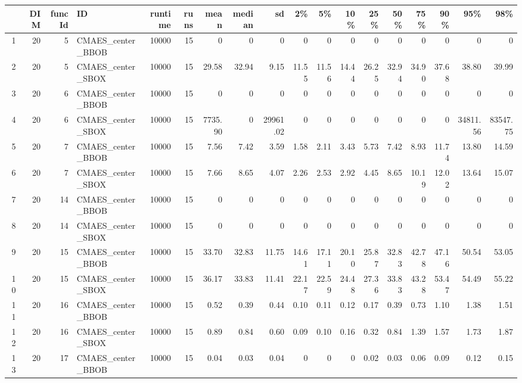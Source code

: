 \begin{table*}[!t]
\centering
\tiny
\begin{tabular}{rrrlrrrrrrrrrrrrrr}
  \hline
 & DIM & funcId & ID & runtime & runs & mean & median & sd & 2\% & 5\% & 10\% & 25\% & 50\% & 75\% & 90\% & 95\% & 98\% \\ 
  \hline
1 & 20 & 5 & CMAES\_center\_BBOB & 10000 &  15 & 0 & 0 & 0 & 0 & 0 & 0 & 0 & 0 & 0 & 0 & 0 & 0 \\ 
  2 & 20 & 5 & CMAES\_center\_SBOX & 10000 &  15 & 29.58 & 32.94 & 9.15 & 11.55 & 11.56 & 14.44 & 26.25 & 32.94 & 34.90 & 37.68 & 38.80 & 39.99 \\ 
  3 & 20 & 6 & CMAES\_center\_BBOB & 10000 &  15 & 0 & 0 & 0 & 0 & 0 & 0 & 0 & 0 & 0 & 0 & 0 & 0 \\ 
  4 & 20 & 6 & CMAES\_center\_SBOX & 10000 &  15 & 7735.90 & 0 & 29961.02 & 0 & 0 & 0 & 0 & 0 & 0 & 0 & 34811.56 & 83547.75 \\ 
  5 & 20 & 7 & CMAES\_center\_BBOB & 10000 &  15 & 7.56 & 7.42 & 3.59 & 1.58 & 2.11 & 3.43 & 5.73 & 7.42 & 8.93 & 11.74 & 13.80 & 14.59 \\ 
  6 & 20 & 7 & CMAES\_center\_SBOX & 10000 &  15 & 7.66 & 8.65 & 4.07 & 2.26 & 2.53 & 2.92 & 4.45 & 8.65 & 10.19 & 12.02 & 13.64 & 15.07 \\ 
  7 & 20 & 14 & CMAES\_center\_BBOB & 10000 &  15 & 0 & 0 & 0 & 0 & 0 & 0 & 0 & 0 & 0 & 0 & 0 & 0 \\ 
  8 & 20 & 14 & CMAES\_center\_SBOX & 10000 &  15 & 0 & 0 & 0 & 0 & 0 & 0 & 0 & 0 & 0 & 0 & 0 & 0 \\ 
  9 & 20 & 15 & CMAES\_center\_BBOB & 10000 &  15 & 33.70 & 32.83 & 11.75 & 14.61 & 17.11 & 20.10 & 25.87 & 32.83 & 42.78 & 47.16 & 50.54 & 53.05 \\ 
  10 & 20 & 15 & CMAES\_center\_SBOX & 10000 &  15 & 36.17 & 33.83 & 11.41 & 22.17 & 22.59 & 24.48 & 27.36 & 33.83 & 43.28 & 53.47 & 54.49 & 55.22 \\ 
  11 & 20 & 16 & CMAES\_center\_BBOB & 10000 &  15 & 0.52 & 0.39 & 0.44 & 0.10 & 0.11 & 0.12 & 0.17 & 0.39 & 0.73 & 1.10 & 1.38 & 1.51 \\ 
  12 & 20 & 16 & CMAES\_center\_SBOX & 10000 &  15 & 0.89 & 0.84 & 0.60 & 0.09 & 0.10 & 0.16 & 0.32 & 0.84 & 1.39 & 1.57 & 1.73 & 1.87 \\ 
  13 & 20 & 17 & CMAES\_center\_BBOB & 10000 &  15 & 0.04 & 0.03 & 0.04 & 0 & 0 & 0 & 0.02 & 0.03 & 0.06 & 0.09 & 0.12 & 0.15 \\ 

\end{tabular}
\end{table*}
